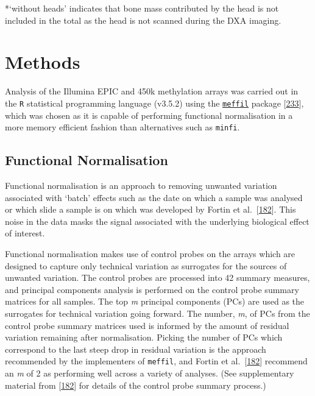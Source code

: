 \documentclass[
]{book}
\begin{document}
*`without heads' indicates that bone mass contributed by the head is not included in the total as the head is not scanned during the DXA imaging.

\hypertarget{arrayMethods}{%
\section{Methods}\label{arrayMethods}}

Analysis of the Illumina EPIC and 450k methylation arrays was carried out in the \texttt{R} statistical programming language (v3.5.2) using the \href{https://github.com/perishky/meffil/wiki}{\texttt{meffil}} package {[}\protect\hyperlink{ref-Min2017}{233}{]}, which was chosen as it is capable of performing functional normalisation in a more memory efficient fashion than alternatives such as \texttt{minfi}.

\hypertarget{functional-normalisation}{%
\subsection{Functional Normalisation}\label{functional-normalisation}}

Functional normalisation is an approach to removing unwanted variation associated with `batch' effects such as the date on which a sample was analysed or which slide a sample is on which was developed by Fortin et al.~{[}\protect\hyperlink{ref-Fortin2014}{182}{]}.
This noise in the data masks the signal associated with the underlying biological effect of interest.

Functional normalisation makes use of control probes on the arrays which are designed to capture only technical variation as surrogates for the sources of unwanted variation.
The control probes are processed into 42 summary measures, and principal components analysis is performed on the control probe summary matrices for all samples.
The top \emph{m} principal components (PCs) are used as the surrogates for technical variation going forward.
The number, \emph{m}, of PCs from the control probe summary matrices used is informed by the amount of residual variation remaining after normalisation.
Picking the number of PCs which correspond to the last steep drop in residual variation is the approach recommended by the implementers of \texttt{meffil}, and Fortin et al.~{[}\protect\hyperlink{ref-Fortin2014}{182}{]} recommend an \emph{m} of 2 as performing well across a variety of analyses.
(See supplementary material from {[}\protect\hyperlink{ref-Fortin2014}{182}{]} for details of the control probe summary process.)
\end{document}
